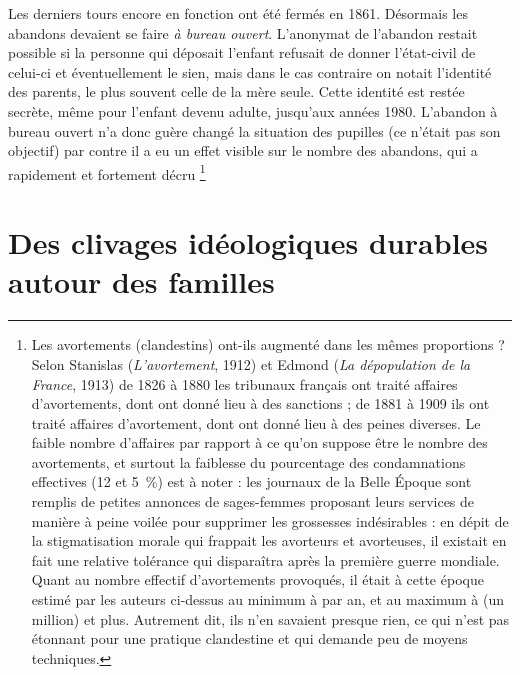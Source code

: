 Les derniers tours encore en fonction ont été fermés en 1861. Désormais les abandons devaient se faire \emph{à bureau ouvert}. L'anonymat de l'abandon restait possible si la personne qui déposait l'enfant refusait de donner l'état-civil de celui-ci et éventuellement le sien, mais dans le cas contraire on notait l'identité des parents, le plus souvent celle de la mère seule. Cette identité est restée secrète, même pour l'enfant devenu adulte, jusqu'aux années 1980. L'abandon à bureau ouvert n'a donc guère changé la situation des pupilles (ce n'était pas son objectif) par contre il a eu un effet visible sur le nombre des abandons, qui a rapidement et fortement décru%
\footnote{Les avortements (clandestins) ont-ils augmenté dans les mêmes proportions ? Selon Stanislas  (\emph{L'avortement}, 1912) et Edmond  (\emph{La dépopulation de la France}, 1913) de 1826 à 1880 les tribunaux français ont traité  affaires d'avortements, dont  ont donné lieu à des sanctions ; de 1881 à 1909 ils ont traité  affaires d'avortement, dont  ont donné lieu à des peines diverses. Le faible nombre d'affaires par rapport à ce qu'on suppose être le nombre des avortements, et surtout la faiblesse du pourcentage des condamnations effectives (12 et 5~\%) est à noter : les journaux de la Belle Époque sont remplis de petites annonces de sages-femmes proposant leurs services de manière à peine voilée pour supprimer les grossesses indésirables : en dépit de la stigmatisation morale qui frappait les avorteurs et avorteuses, il existait en fait une relative tolérance qui disparaîtra après la première guerre mondiale. Quant au nombre effectif d'avortements provoqués, il était à cette époque estimé par les auteurs ci-dessus au minimum à  par an, et au maximum à  (un million) et plus. Autrement dit, ils n'en savaient presque rien, ce qui n'est pas étonnant pour une pratique clandestine et qui demande peu de moyens techniques.}%


\section{Des clivages idéologiques durables autour des familles}

